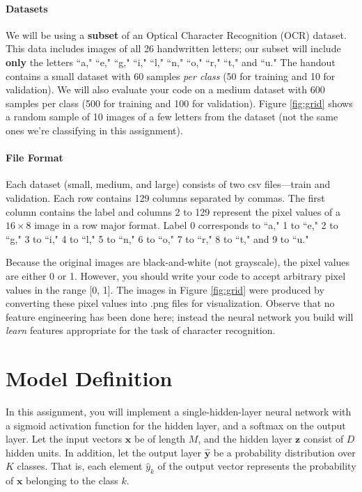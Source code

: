 \documentclass[11pt,addpoints,answers]{exam}
\newcommand{\xv}{\mathbf{x}}
\newcommand{\yv}{\mathbf{y}}
\newcommand{\zv}{\mathbf{z}}
\begin{document}
\paragraph{Datasets} We will be using a \textbf{subset} of an Optical Character Recognition (OCR) dataset. This data includes images of all 26 handwritten letters; our subset will include \textbf{only} the letters ``a," ``e," ``g," ``i," ``l," ``n," ``o," ``r," ``t," and ``u."  The handout contains a small dataset with 60 samples \textit{per class} (50 for training and 10 for validation). We will also evaluate your code on a medium dataset with 600 samples per class (500 for training and 100 for validation). Figure \ref{fig:grid} shows a random sample of 10 images of a few letters from the dataset (not the same ones we're classifying in this assignment).

\paragraph{File Format} Each dataset (small, medium, and large) consists of two csv files---train and validation. Each row contains 129 columns separated by commas. The first column contains the label and columns 2 to 129 represent the pixel values of a $16 \times 8$ image in a row major format. Label 0 corresponds to ``a," 1 to ``e," 2 to ``g," 3 to ``i," 4 to ``l," 5 to ``n," 6 to ``o," 7 to ``r," 8 to ``t," and 9 to ``u."

Because the original images are black-and-white (not grayscale), the pixel values are either 0 or 1. However, you should write your code to accept arbitrary pixel values in the range [0, 1]. The images in Figure \ref{fig:grid} were produced by converting these pixel values into .png files for visualization. Observe that no feature engineering has been done here; instead the neural network you build will \emph{learn} features appropriate for the task of character recognition.

\section{Model Definition}
\label{sec:model}

In this assignment, you will implement a single-hidden-layer neural network with a sigmoid activation function for the hidden layer, and a softmax on the output layer. Let the input vectors $\xv$ be of length $M$, and the hidden layer $\zv$ consist of $D$ hidden units. In addition, let the output layer $\hat{\yv}$ be a probability distribution over $K$ classes. That is, each element $\hat{y}_k$ of the output vector represents the probability of $\xv$ belonging to the class $k$.
\end{document}
